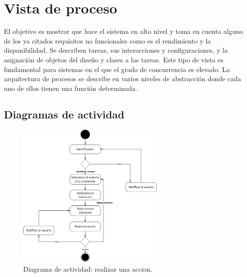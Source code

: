 \chapter{Vista de proceso}
El objetivo es mostrar que hace el sistema en alto nivel y toma en cuenta alguno de los ya citados requisitos no funcionales como es el rendimiento y la disponibilidad. Se describen tareas, sus interacciones y configuraciones, y la asignaci\'on de objetos del dise\~no y clases a las tareas. 
Este tipo de vista es fundamental para sistemas en el que el grado de concurrencia es elevado.
La arquitectura de procesos se describe en varios niveles de abstracci\'on donde cada uno de ellos tienen una funci\'on determinada.

\section{Diagramas de actividad}

\begin{figure}
	\centering
	\includegraphics[width=0.65\textwidth]{4.Disenio/Imagenes/ACT-Accion}
	\caption{Diagrama de actividad: realizar una accion.}
	\label{fig:diagramaAccion}
\end{figure}

